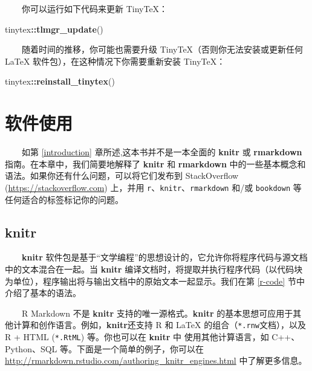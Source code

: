 \documentclass[
  12pt,
]{krantz}
\newenvironment{Shaded}{\begin{snugshade}}{\end{snugshade}}
\newcommand{\FunctionTok}[1]{\textcolor[rgb]{0.13,0.29,0.53}{\textbf{#1}}}
\newcommand{\NormalTok}[1]{#1}
\newcommand{\SpecialCharTok}[1]{\textcolor[rgb]{0.81,0.36,0.00}{\textbf{#1}}}
\theoremstyle{definition}
\theoremstyle{definition}
\theoremstyle{definition}
\theoremstyle{definition}
\theoremstyle{remark}
\begin{document}
  你可以运行如下代码来更新 TinyTeX：

\begin{Shaded}
\begin{Highlighting}[]
\NormalTok{tinytex}\SpecialCharTok{::}\FunctionTok{tlmgr\_update}\NormalTok{()}
\end{Highlighting}
\end{Shaded}

  随着时间的推移，你可能也需要升级 TinyTeX（否则你无法安装或更新任何 LaTeX 软件包），在这种情况下你需要重新安装 TinyTeX：

\begin{Shaded}
\begin{Highlighting}[]
\NormalTok{tinytex}\SpecialCharTok{::}\FunctionTok{reinstall\_tinytex}\NormalTok{()}
\end{Highlighting}
\end{Shaded}

\hypertarget{software-usage}{%
\chapter{软件使用}\label{software-usage}}

  如第 \ref{introduction} 章所述,这本书并不是一本全面的 \textbf{knitr} 或 \textbf{rmarkdown} 指南。在本章中，我们简要地解释了 \textbf{knitr} 和 \textbf{rmarkdown} 中的一些基本概念和语法。如果你还有什么问题，可以将它们发布到 StackOverflow (\url{https://stackoverflow.com}) 上，并用 \texttt{r}、\texttt{knitr}、\texttt{rmarkdown} 和/或 \texttt{bookdown} 等任何适合的标签标记你的问题。

\hypertarget{knitr}{%
\section{knitr}\label{knitr}}

  \textbf{knitr} 软件包是基于``文学编程''\citep{knuth1984}的思想设计的，它允许你将程序代码与源文档中的文本混合在一起。当 \textbf{knitr} 编译文档时，将提取并执行程序代码（以代码块为单位），程序输出将与输出文档中的原始文本一起显示。我们在第 \ref{r-code} 节中介绍了基本的语法。

  R Markdown 不是 \textbf{knitr} 支持的唯一源格式。\textbf{knitr} 的基本思想可应用于其他计算和创作语言。例如，\textbf{knitr}还支持 R 和 LaTeX 的组合（\texttt{*.rnw}文档），以及 R + HTML (\texttt{*.RtML}) 等。你也可以在 \textbf{knitr} 中 使用其他计算语言，如 C++、Python、SQL 等。下面是一个简单的例子，你可以在 \url{http://rmarkdown.rstudio.com/authoring_knitr_engines.html} 中了解更多信息。
\end{document}
